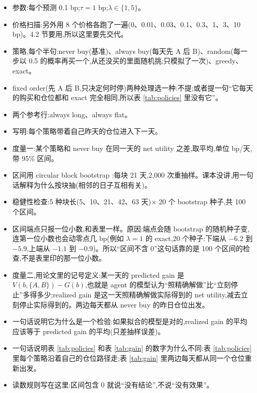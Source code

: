 \documentclass{article}
\newenvironment{pts}{\begin{itemize}[nosep,leftmargin=1.15em,topsep=1pt]}{\end{itemize}}
\begin{document}
\begin{note}[第 3 段,约 80 词:参数和比较的策略]
\begin{pts}
\item 参数:每个预测 0.1 bp;$\tau = 1$ bp;$\lambda \in \{1, 5\}$。
\item 价格扫描:另外用 8 个价格各跑了一遍(0、0.01、0.03、0.1、0.3、1、3、10 bp)。4.2 节要用,所以这里要先交代。
\item 策略,每个半句:never buy(基准)、always buy(每天先 A 后 B)、random(每一步以 0.5 的概率再买一个,从还没买的里面随机挑;只模拟了一次)、greedy、exact。
\item fixed order(先 A 后 B,只决定何时停)两种处理选一种:不提;或者提一句``它每天的购买和仓位都和 exact 完全相同,所以表 \ref{tab:policies} 里没有它''。
\item 两个参考行:always long、always flat。
\item 写明:每个策略带着自己昨天的仓位进入下一天。
\end{pts}
\end{note}

\begin{note}
\begin{pts}
\item 度量一:某个策略和 never buy 在同一天的 net utility 之差,取平均,单位 bp/天,带 95\% 区间。
\item 区间用 circular block bootstrap \citep{politis1992circular}:每块 21 天,2{,}000 次重抽样。课本没讲,用一句话解释为什么按块抽(相邻的日子互相有关)。
\item 稳健性检查:5 种块长(5、10、21、42、63 天)$\times$ 20 个 bootstrap 种子,共 100 个区间。
\item 区间端点只报一位小数,和表里一样。原因:端点会随 bootstrap 的随机种子变,连第一位小数也会动零点几 bp(例如 $\lambda=1$ 的 exact,20 个种子:下端从 $-6.2$ 到 $-5.9$,上端从 $-1.1$ 到 $-0.9$)。所以``区间不含 0''这句话靠的是 100 个区间的检查,不是表里印的那一位小数。
\item 度量二,用论文里的记号定义:某一天的 predicted gain 是 $V(b,\{A,B\}) - G(b)$,也就是 agent 的模型认为``照精确解做''比``立刻停止''多得多少;realized gain 是这一天照精确解做实际得到的 net utility,减去立刻停止实际得到的。两边每天都从 never buy 的昨日仓位出发。
\item 一句话说明它为什么是一个检验:如果拟合的模型是对的,realized gain 的平均应该等于 predicted gain 的平均(只差抽样误差)。
\item 一句话说明表 \ref{tab:policies} 和表 \ref{tab:gain} 的数字为什么不同:表 \ref{tab:policies} 里每个策略沿着自己的仓位路径走;表 \ref{tab:gain} 里两边每天都从同一个仓位重新出发。
\item 读数规则写在这里:区间包含 0 就说``没有结论'',不说``没有效果''。
\end{pts}
\end{note}
\end{document}

